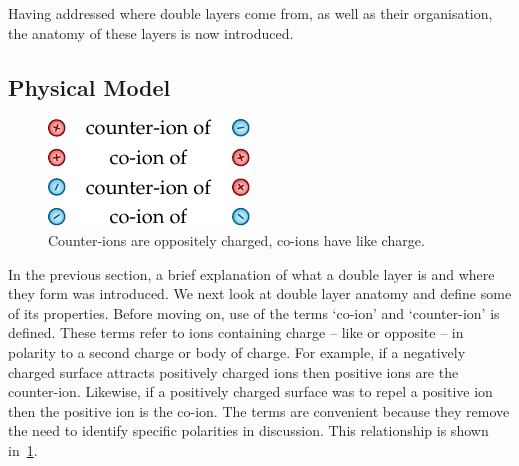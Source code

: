 

    Having addressed where double layers come from, as well as their organisation, the anatomy of these layers is now introduced.


  \subsection{Physical Model}
    \label{sub:background_doubleLayers_physicalModel}


    \begin{figure}
      \begin{center}
        \includegraphics{content/introduction/graphics/counterAndCoIons}
      \end{center}
      \caption{Counter-ions are oppositely charged, co-ions have like charge.}
      \label{fig:counterAndCoIons}
    \end{figure}
    In the previous section, a brief explanation of what a double layer is and where they form was introduced.
    We next look at double layer anatomy and define some of its properties.
    Before moving on, use of the terms `co-ion' and `counter-ion' is defined.
    These terms refer to ions containing charge -- like or opposite -- in polarity to a second charge or body of charge.
    For example, if a negatively charged surface attracts positively charged ions then positive ions are the counter-ion.
    Likewise, if a positively charged surface was to repel a positive ion then the positive ion is the co-ion.
    The terms are convenient because they remove the need to identify specific polarities in discussion.
    This relationship is shown in~\cref{fig:counterAndCoIons}.


